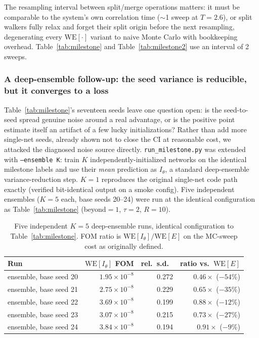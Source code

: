 \documentclass[11pt]{article}
\begin{document}
	The resampling interval between split/merge operations matters: it must be comparable to
	the system's own correlation time ($\sim$1 sweep at $T=2.6$), or split walkers fully relax
	and forget their split origin before the next resampling, degenerating every
	$\mathrm{WE}[\cdot]$ variant to naive Monte Carlo with bookkeeping overhead. Table~\ref{tab:milestone}
	and Table~\ref{tab:milestone2} use an interval of 2 sweeps.

	\subsubsection{A deep-ensemble follow-up: the seed variance is reducible, but it converges
		to a loss}
	\label{sec:ensemble}
	Table~\ref{tab:milestone}'s seventeen seeds leave one question open: is the
	seed-to-seed spread genuine noise around a real advantage, or is the positive point
	estimate itself an artifact of a few lucky initializations? Rather than add more single-net
	seeds, already shown not to close the CI at reasonable cost, we attacked the diagnosed
	noise source directly. \texttt{run\_milestone.py} was extended with \texttt{--ensemble
		K}: train $K$ independently-initialized networks on the identical milestone labels and
	use their \emph{mean} prediction as $I_\theta$, a standard deep-ensemble variance-reduction
	step. $K=1$ reproduces the original single-net code path exactly (verified bit-identical
	output on a smoke config). Five independent ensembles ($K=5$ each, base seeds 20--24) were
	run at the identical configuration as Table~\ref{tab:milestone} (beyond$=1$, $\tau=2$, $R=10$).

	\begin{table}[h]
		\centering\small
		\caption{Five independent $K{=}5$ deep-ensemble runs, identical configuration to
			Table~\ref{tab:milestone}. FOM ratio is $\mathrm{WE}[I_\theta]/\mathrm{WE}[E]$ on the
			MC-sweep cost as originally defined.}
		\label{tab:ensemble}
		\begin{tabular}{lrrr}
			\toprule
			Run & $\mathrm{WE}[I_\theta]$ FOM & rel.\ s.d.\ & ratio vs.\ $\mathrm{WE}[E]$ \\
			\midrule
			ensemble, base seed 20 & $1.95\times10^{-8}$ & 0.272 & $0.46\times$ ($-54\%$) \\
			ensemble, base seed 21 & $2.75\times10^{-8}$ & 0.229 & $0.65\times$ ($-35\%$) \\
			ensemble, base seed 22 & $3.69\times10^{-8}$ & 0.199 & $0.88\times$ ($-12\%$) \\
			ensemble, base seed 23 & $3.07\times10^{-8}$ & 0.215 & $0.73\times$ ($-27\%$) \\
			ensemble, base seed 24 & $3.84\times10^{-8}$ & 0.194 & $0.91\times$ ($-9\%$) \\
			\bottomrule
		\end{tabular}
	\end{table}
\end{document}
